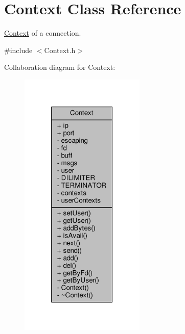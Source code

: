 \hypertarget{classContext}{}\section{Context Class Reference}
\label{classContext}


\hyperlink{classContext}{Context} of a connection.  




{\ttfamily \#include $<$Context.\+h$>$}



Collaboration diagram for Context\+:
\nopagebreak
\begin{figure}[H]
\begin{center}
\leavevmode
\includegraphics[width=169pt]{classContext__coll__graph}
\end{center}
\end{figure}
